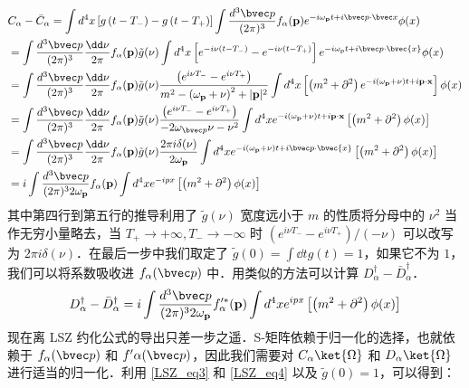 \begin{equation} \begin{aligned}
&C_\alpha-\bar{C}_\alpha=\int d^4  x\left[g\left(t-T_{-}\right)-g\left(t-T_{+}\right)\right] \int \frac{d^3 {\bvec p}}{(2 \pi)^3} f_\alpha(\mathbf{p}) e^{-i \omega_{\mathbf{p}} t+i \bvec p \cdot \bvec x} \phi(x)\\
&=\int \frac{d^3{\bvec p}}{(2 \pi)^3} \frac{\dd \nu}{2 \pi} f_\alpha(\mathbf{p}) \tilde{g}(\nu) \int d^4  x\left[e^{-i \nu\left(t-T_{-}\right)}-e^{-i \nu\left(t-T_{+}\right)}\right] e^{-i \omega_{\mathrm{p}} t+i \bvec p \cdot \bvec{x}} \phi(x)\\
&=\int \frac{d^3{\bvec p}}{(2 \pi)^3} \frac{\dd \nu}{2 \pi} f_\alpha(\mathbf{p}) \tilde{g}(\nu) \frac{\left(e^{i \nu T_{-}}-e^{i \nu T_{+}}\right)}{m^2-\left(\omega_{\mathbf{p}}+\nu\right)^2+|\mathbf{p}|^2} \int d^4  x\left[\left(m^2+\partial^2\right) e^{-i\left(\omega_{\mathbf{p}}+\nu\right) t+i \mathbf{p} \cdot \mathbf{x}}\right] \phi(x)\\
&=\int \frac{d^3{\bvec p}}{(2 \pi)^3} \frac{\dd \nu}{2 \pi} f_\alpha(\mathbf{p}) \tilde{g}(\nu) \frac{\left(e^{i \nu T_{-}}-e^{i\nu T_{+}}\right)}{-2\omega_{\bvec p}\nu - \nu^2} \int d^4  x e^{-i\left(\omega_{\mathbf{p}}+\nu\right) t+i \mathbf{p} \cdot \mathbf{x}}\left[\left(m^2+\partial^2\right) \phi(x)\right]\\
&=\int \frac{d^3{\bvec p}}{(2 \pi)^3} \frac{\dd \nu}{2 \pi} f_\alpha(\mathbf{p}) \tilde{g}(\nu) \frac{2 \pi i \delta(\nu)}{2 \omega_{\mathbf{p}}} \int d^4  x e^{-i\left(\omega_{\mathbf{p}}+\nu\right) t+i \bvec p \cdot \bvec{x}}\left[\left(m^2+\partial^2\right) \phi(x)\right]\\
&=i \int \frac{d^3{\bvec p}}{(2 \pi)^3 2 \omega_{\mathbf{p}}} f_\alpha(\mathbf{p}) \int d^4 x e^{-ipx}\left[\left(m^2+\partial^2\right) \phi(x)\right]
\end{aligned}\end{equation}
其中第四行到第五行的推导利用了 $\tilde{g}(\nu)$ 宽度远小于 $m$ 的性质将分母中的 $\nu^2$ 当作无穷小量略去，当 $T_+\rightarrow +\infty,T_-\rightarrow -\infty$ 时 $(e^{i\nu T_-}-e^{i\nu T_+})/(-\nu)$ 可以改写为 $2\pi i\delta(\nu)$．在最后一步中我们取定了 $\tilde g(0)=\int \dd{t} g(t)=1$，如果它不为 $1$，我们可以将系数吸收进 $f_\alpha(\bvec p)$ 中．用类似的方法可以计算 $D_\alpha^\dagger-\bar{D}_\alpha^\dagger$．
\[
D_\alpha^\dagger-\bar{D}_\alpha^\dagger=i \int \frac{d^3{\bvec p}}{(2 \pi)^3 2 \omega_{\mathbf{p}}} f'^{*}_\alpha(\mathbf{p}) \int d^4 x e^{ipx}\left[\left(m^2+\partial^2\right) \phi(x)\right]
\]
现在离 LSZ 约化公式的导出只差一步之遥．S-矩阵依赖于归一化的选择，也就依赖于 $f_\alpha(\bvec p)$ 和 $f'\alpha(\bvec p)$，因此我们需要对 $C_\alpha\ket{\Omega}$ 和 $D_\alpha\ket{\Omega}$ 进行适当的归一化．利用 \autoref{LSZ_eq3}  和 \autoref{LSZ_eq4}  以及 $\tilde g(0)=1$，可以得到：
